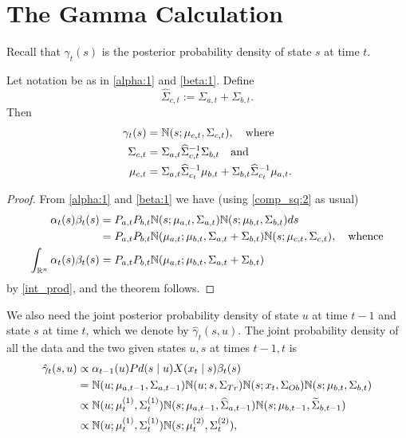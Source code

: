 \documentclass[12pt,leqno]{article}
\begin{document}
\section{The Gamma Calculation}
Recall that $\gamma_t(s)$ is the posterior probability density of state $s$
at time $t$. 
\begin{Thm}
  Let notation be as in \eqref{alpha:1} and \eqref{beta:1}.  Define
$$
  \widehat{\Sigma}_{c,t} := \Sigma_{a,t}+\Sigma_{b,t}.
  $$
  Then
  \begin{align*}
      \gamma_t(s) &= {\mathbb N}(s;\mu_{c,t},\Sigma_{c,t}),\quad\text{where}\\
      \Sigma_{c,t} &= \Sigma_{a,t}\widehat{\Sigma}_{c,t}^{-1}\Sigma_{b,t}
      \quad\text{and}\\
      \mu_{c,t} &= \Sigma_{a,t}\widehat{\Sigma}_{c_t}^{-1}\mu_{b,t} +
      \Sigma_{b,t}\widehat{\Sigma}_{c_t}^{-1}\mu_{a,t}.
  \end{align*}
\end{Thm}
\begin{proof}
  From \eqref{alpha:1} and \eqref{beta:1} we have (using \eqref{comp_sq:2}
  as usual)
  \begin{align*}
  \alpha_t(s)\beta_t(s) &= P_{a,t}P_{b,t}{\mathbb N}(s;\mu_{a,t},\Sigma_{a,t})
  {\mathbb N}(s;\mu_{b,t},\Sigma_{b,t})ds\\
  &= P_{a,t}P_{b,t}{\mathbb N}(\mu_{a,t};\mu_{b,t},\Sigma_{a,t}+\Sigma_{b,t}){\mathbb N}(s;\mu_{c,t},
  \Sigma_{c,t}), \quad\text{whence}\\
  \int_{{\mathbb R}^n}\alpha_t(s)\beta_t(s) &= P_{a,t}P_{b,t}{\mathbb N}(\mu_{a,t};\mu_{b,t},\Sigma_{a,t}+\Sigma_{b,t})
  \end{align*}
by \eqref{int_prod}, and the theorem follows.
\end{proof}
We also need the joint posterior probability density of state $u$ at time $t-1$ and state $s$ at time $t$,
which we denote by $\hat{\gamma}_t(s,u)$. The joint probability density of all the data and the two given states
  $u,s$  at times $t-1,t$ is
  \begin{align}
    \hat{\gamma}_t(s,u) &\propto \alpha_{t-1}(u)Pd(s\mid u)X(x_t\mid s)\beta_t(s) \notag\\
    &= {\mathbb N}(u;\mu_{a,t-1},\Sigma_{a,t-1}){\mathbb N}(u;s,\Sigma_{Tr})  {\mathbb N}(s;x_t,\Sigma_{Ob}){\mathbb N}(s;\mu_{b,t},\Sigma_{b,t})\notag\\
    &\propto {\mathbb N}(u;\mu^{(1)}_t,\Sigma^{(1)}_t){\mathbb N}(s;\mu_{a,t-1},\widehat{\Sigma}_{a,t-1}){\mathbb N}(s;\mu_{b,t-1},
    \widetilde{\Sigma}_{b,t-1})\notag\\
    &\propto {\mathbb N}(u;\mu^{(1)}_t,\Sigma^{(1)}_t){\mathbb N}(s;\mu^{(2)}_t,\Sigma^{(2)}_t),\label{gamma_hat}
  \end{align}
\end{document}
